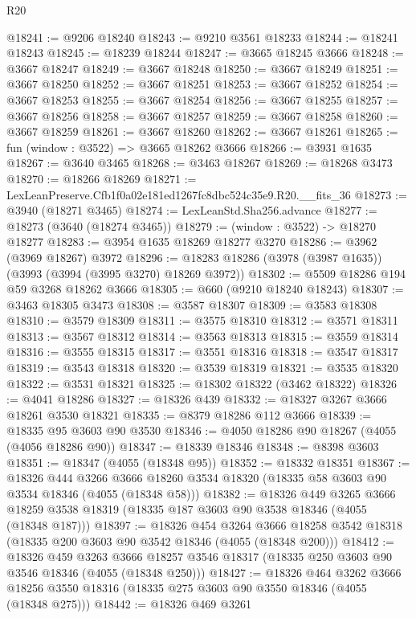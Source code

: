 \begin{lexlean}{R20}
\begin{coremodule}
@18241 := @9206 @18240
@18243 := @9210 @3561 @18233
@18244 := @18241 @18243
@18245 := @18239 @18244
@18247 := @3665 @18245 @3666
@18248 := @3667 @18247
@18249 := @3667 @18248
@18250 := @3667 @18249
@18251 := @3667 @18250
@18252 := @3667 @18251
@18253 := @3667 @18252
@18254 := @3667 @18253
@18255 := @3667 @18254
@18256 := @3667 @18255
@18257 := @3667 @18256
@18258 := @3667 @18257
@18259 := @3667 @18258
@18260 := @3667 @18259
@18261 := @3667 @18260
@18262 := @3667 @18261
@18265 := fun (window : @3522) => @3665 @18262 @3666
@18266 := @3931 @1635
@18267 := @3640 @3465
@18268 := @3463 @18267
@18269 := @18268 @3473
@18270 := @18266 @18269
@18271 := LexLeanPreserve.Cfb1f0a02e181ed1267fc8dbc524c35e9.R20.__fits_36
@18273 := @3940 (@18271 @3465)
@18274 := LexLeanStd.Sha256.advance
@18277 := @18273 (@3640 (@18274 @3465))
@18279 := (window : @3522) -> @18270 @18277
@18283 := @3954 @1635 @18269 @18277 @3270
@18286 := @3962 (@3969 @18267) @3972
@18296 := @18283 @18286 (@3978 (@3987 @1635)) (@3993 (@3994 (@3995 @3270) @18269 @3972))
@18302 := @5509 @18286 @194 @59 @3268 @18262 @3666
@18305 := @660 (@9210 @18240 @18243)
@18307 := @3463 @18305 @3473
@18308 := @3587 @18307
@18309 := @3583 @18308
@18310 := @3579 @18309
@18311 := @3575 @18310
@18312 := @3571 @18311
@18313 := @3567 @18312
@18314 := @3563 @18313
@18315 := @3559 @18314
@18316 := @3555 @18315
@18317 := @3551 @18316
@18318 := @3547 @18317
@18319 := @3543 @18318
@18320 := @3539 @18319
@18321 := @3535 @18320
@18322 := @3531 @18321
@18325 := @18302 @18322 (@3462 @18322)
@18326 := @4041 @18286
@18327 := @18326 @439
@18332 := @18327 @3267 @3666 @18261 @3530 @18321
@18335 := @8379 @18286 @112 @3666
@18339 := @18335 @95 @3603 @90 @3530
@18346 := @4050 @18286 @90 @18267 (@4055 (@4056 @18286 @90))
@18347 := @18339 @18346
@18348 := @8398 @3603
@18351 := @18347 (@4055 (@18348 @95))
@18352 := @18332 @18351
@18367 := @18326
    @444
    @3266
    @3666
    @18260
    @3534
    @18320
    (@18335 @58 @3603 @90 @3534 @18346 (@4055 (@18348 @58)))
@18382 := @18326
    @449
    @3265
    @3666
    @18259
    @3538
    @18319
    (@18335 @187 @3603 @90 @3538 @18346 (@4055 (@18348 @187)))
@18397 := @18326
    @454
    @3264
    @3666
    @18258
    @3542
    @18318
    (@18335 @200 @3603 @90 @3542 @18346 (@4055 (@18348 @200)))
@18412 := @18326
    @459
    @3263
    @3666
    @18257
    @3546
    @18317
    (@18335 @250 @3603 @90 @3546 @18346 (@4055 (@18348 @250)))
@18427 := @18326
    @464
    @3262
    @3666
    @18256
    @3550
    @18316
    (@18335 @275 @3603 @90 @3550 @18346 (@4055 (@18348 @275)))
@18442 := @18326
    @469
    @3261

\end{coremodule}
\end{lexlean}
